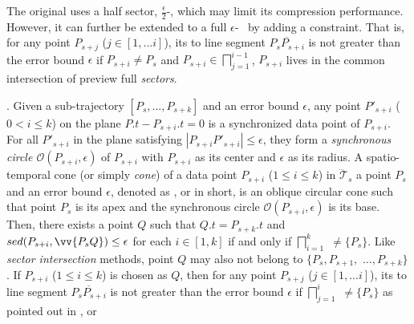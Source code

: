 The original \siped uses a half sector, $\frac{\epsilon}{2}$-\sector, which may limit its compression performance. However, it can further be extended to a full ${\epsilon}$-\sector ~ by adding a constraint. That is, for any point $P_{s+j}$ ($j \in [1, ... i]$), its \ped to
line segment $\overline{P_sP_{s+i}}$ is not greater than the error bound $\epsilon$ if $ P_{s+i} \ne {P_s}$ and $P_{s+i}\in \bigsqcap_{j=1}^{i-1}$, \ie $P_{s+i}$ lives in the common intersection of preview full \emph{sectors}.

.
%
Given a sub-trajectory $[P_s,...,P_{s+k}]$ and an error bound $\epsilon$, any point $P'_{s+i}$ ($0< i \le k$) on the plane $P.t-P_{s+i}.t = 0$ is a synchronized data point of $P_{s+i}$. For all $P'_{s+i}$ in the plane satisfying $|P_{s+i}P'_{s+i}| \le \epsilon$, they form a \textit{synchronous circle $\mathcal{O}(P_{s+i}, \epsilon)$} of $P_{s+i}$ with $P_{s+i}$ as its center and $\epsilon$ as its radius.
%
A spatio-temporal cone (or simply \textit{cone}) of a data point $P_{s+i}$ ($1\le i\le k$) in $\dddot{\mathcal{T}}_s$ \wrt a point $P_s$ and an error bound $\epsilon$, denoted as , or  in short, is an oblique circular cone such that point $P_s$ is its apex and the synchronous circle $\mathcal{O}(P_{s+i}, \epsilon)$ is its base.
%
Then, there exists a point $Q$ such that $Q.t = P_{s+k}.t$ and $sed(P_{s+i}, \vv{P_sQ})\le \epsilon$ for each $i \in [1,k]$ if and only if $\bigsqcap_{i=1}^{k}$ $\ne \{P_s\}$.
%
Like \textit{sector intersection} methods, point $Q$ may also not belong to $\{P_{s}, P_{s+1},$ $\ldots, P_{s+k}\}$. If $P_{s+i}$ ($1\le i\le k$) is chosen as $Q$, then for any point $P_{s+j}$ ($j \in [1, ... i]$), its \sed to
line segment $\overline{P_sP_{s+i}}$ is not greater than the error bound $\epsilon$ if
$\bigsqcap_{j=1}^{i}$ $\ne \{P_s\}$ as pointed out in \cite{Lin:Cised}, or



